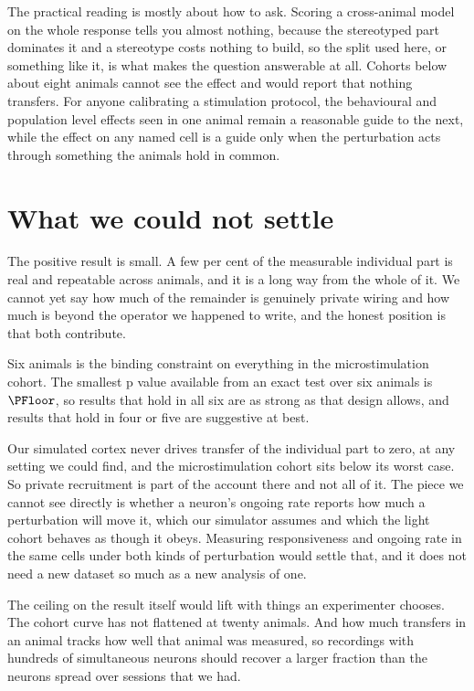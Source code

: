 \documentclass[11pt,letterpaper]{article}
\begin{document}
The practical reading is mostly about how to ask. Scoring a cross-animal model on the
whole response tells you almost nothing, because the stereotyped part dominates it and
a stereotype costs nothing to build, so the split used here, or something like it, is
what makes the question answerable at all. Cohorts below about eight animals cannot see
the effect and would report that nothing transfers. For anyone calibrating a
stimulation protocol, the behavioural and population level effects seen in one animal
remain a reasonable guide to the next, while the effect on any named cell is a guide
only when the perturbation acts through something the animals hold in common.

\section{What we could not settle}

The positive result is small. A few per cent of the measurable individual part is real
and repeatable across animals, and it is a long way from the whole of it. We cannot yet
say how much of the remainder is genuinely private wiring and how much is beyond the
operator we happened to write, and the honest position is that both contribute.

Six animals is the binding constraint on everything in the microstimulation cohort.
The smallest p value available from an exact test over six animals is $\PFloor$, so
results that hold in all six are as strong as that design allows, and results that hold
in four or five are suggestive at best.

Our simulated cortex never drives transfer of the individual part to zero, at any
setting we could find, and the microstimulation cohort sits below its worst case. So
private recruitment is part of the account there and not all of it. The piece we cannot
see directly is whether a neuron's ongoing rate reports how much a perturbation will
move it, which our simulator assumes and which the light cohort behaves as though it
obeys. Measuring responsiveness and ongoing rate in the same cells under both kinds of
perturbation would settle that, and it does not need a new dataset so much as a new
analysis of one.

The ceiling on the result itself would lift with things an experimenter chooses. The cohort curve has not flattened at twenty animals. And how
much transfers in an animal tracks how well that animal was measured, so recordings
with hundreds of simultaneous neurons should recover a larger fraction than the
\AlmUnits{} neurons spread over \AlmSessions{} sessions that we had.
\end{document}
